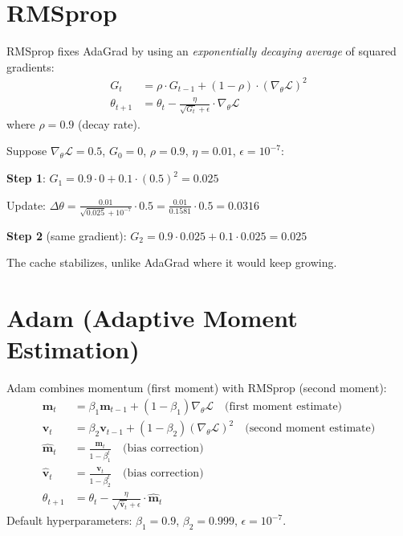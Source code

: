 \documentclass[12pt, a4paper]{report}
\theoremstyle{definition}
\begin{document}
\section{RMSprop}

RMSprop fixes AdaGrad by using an \textit{exponentially decaying average} of squared gradients:
\begin{align}
    G_t &= \rho \cdot G_{t-1} + (1 - \rho) \cdot (\nabla_\theta \mathcal{L})^2 \\
    \theta_{t+1} &= \theta_t - \frac{\eta}{\sqrt{G_t} + \epsilon} \cdot \nabla_\theta \mathcal{L}
\end{align}
where $\rho = 0.9$ (decay rate).

\begin{numexample}
Suppose $\nabla_\theta \mathcal{L} = 0.5$, $G_0 = 0$, $\rho = 0.9$, $\eta = 0.01$, $\epsilon = 10^{-7}$:

\textbf{Step 1}: $G_1 = 0.9 \cdot 0 + 0.1 \cdot (0.5)^2 = 0.025$

Update: $\Delta\theta = \frac{0.01}{\sqrt{0.025} + 10^{-7}} \cdot 0.5 = \frac{0.01}{0.1581} \cdot 0.5 = \boxed{0.0316}$

\textbf{Step 2} (same gradient): $G_2 = 0.9 \cdot 0.025 + 0.1 \cdot 0.025 = 0.025$

The cache stabilizes, unlike AdaGrad where it would keep growing.
\end{numexample}

\section{Adam (Adaptive Moment Estimation)}

Adam combines momentum (first moment) with RMSprop (second moment):
\begin{align}
    \mathbf{m}_t &= \beta_1 \mathbf{m}_{t-1} + (1-\beta_1) \nabla_\theta \mathcal{L} \quad \text{(first moment estimate)} \\
    \mathbf{v}_t &= \beta_2 \mathbf{v}_{t-1} + (1-\beta_2) (\nabla_\theta \mathcal{L})^2 \quad \text{(second moment estimate)} \\
    \hat{\mathbf{m}}_t &= \frac{\mathbf{m}_t}{1 - \beta_1^t} \quad \text{(bias correction)} \\
    \hat{\mathbf{v}}_t &= \frac{\mathbf{v}_t}{1 - \beta_2^t} \quad \text{(bias correction)} \\
    \theta_{t+1} &= \theta_t - \frac{\eta}{\sqrt{\hat{\mathbf{v}}_t} + \epsilon} \cdot \hat{\mathbf{m}}_t
\end{align}
Default hyperparameters: $\beta_1 = 0.9$, $\beta_2 = 0.999$, $\epsilon = 10^{-7}$.
\end{document}

